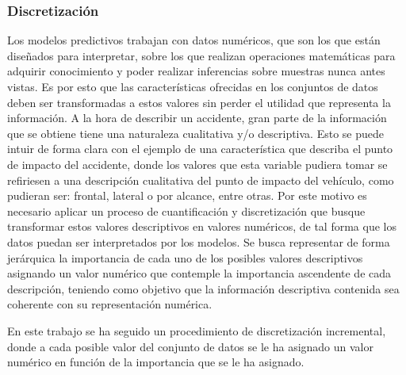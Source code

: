 \subsubsection{Discretización}

Los modelos predictivos trabajan con datos numéricos, que son los que están diseñados para interpretar, sobre los que realizan operaciones matemáticas para adquirir conocimiento y poder realizar inferencias sobre muestras nunca antes vistas. Es por esto que las características ofrecidas en los conjuntos de datos deben ser transformadas a estos valores sin perder el utilidad que representa la información. A la hora de describir un accidente, gran parte de la información que se obtiene tiene una naturaleza cualitativa y/o descriptiva. Esto se puede intuir de forma clara con el ejemplo de una característica que describa el punto de impacto del accidente, donde los valores que esta variable pudiera tomar se refiriesen a una descripción cualitativa del punto de impacto del vehículo, como pudieran ser: frontal, lateral o por alcance, entre otras. Por este motivo es necesario aplicar un proceso de cuantificación y discretización que busque transformar estos valores descriptivos en valores numéricos, de tal forma que los datos puedan ser interpretados por los modelos. Se busca representar de forma jerárquica la importancia de cada uno de los posibles valores descriptivos asignando un valor numérico que contemple la importancia ascendente de cada descripción, teniendo como objetivo que la información descriptiva contenida sea coherente con su representación numérica.


En este trabajo se ha seguido un procedimiento de discretización incremental, donde a cada posible valor del conjunto de datos se le ha asignado un valor numérico en función de la importancia que se le ha asignado.


